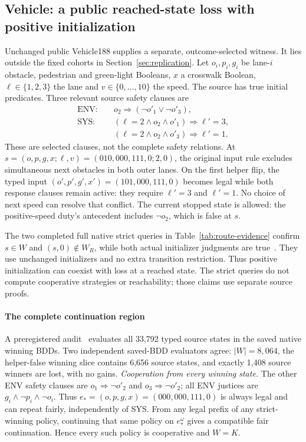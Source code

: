 \subsection{Vehicle: a public reached-state loss with positive initialization}
\label{sec:vehicle}
Unchanged public Vehicle188 supplies a separate, outcome-selected witness.
It lies outside the fixed cohorts in Section~\ref{sec:replication}.
Let $o_i,p_i,g_i$ be lane-$i$ obstacle, pedestrian and green-light
Booleans, $x$ a crosswalk Boolean, $\ell\in\{1,2,3\}$ the lane and
$v\in\{0,\ldots,10\}$ the speed. The source has true initial predicates.
Three relevant source safety clauses are
\[
\begin{aligned}
\mathrm{ENV}:\quad &o_2\Rightarrow(\neg o'_1\lor\neg o'_3),\\
\mathrm{SYS}:\quad &(\ell=2\land o_2\land o'_1)\Rightarrow\ell'=3,\\
& (\ell=2\land o_2\land o'_3)\Rightarrow\ell'=1.
\end{aligned}
\]
These are selected clauses, not the complete safety relations. At
$s=(o,p,g,x;\ell,v)=(010,000,111,0;2,0)$, the original input rule
excludes simultaneous next obstacles in both outer lanes. On the first
helper flip, the typed input $(o',p',g',x')=(101,000,111,0)$ becomes
legal while both response clauses remain active: they require
$\ell'=3$ and $\ell'=1$. No choice of next speed can resolve that conflict.
The current stopped state is allowed: the positive-speed duty's antecedent
includes $\neg o_2$, which is false at $s$.

The two completed full native strict queries in
Table~\ref{tab:route-evidence} confirm $s\in W$ and $(s,0)\notin W_R$,
while both actual initializer judgments are true~\cite{vehicleartifact}.
They use unchanged initializers and no extra transition restriction.
Thus positive initialization can coexist with loss at a reached state.
The strict queries do not compute cooperative strategies or reachability;
those claims use separate source proofs.

\paragraph{The complete continuation region}
A preregistered audit~\cite{vehiclewholeartifact} evaluates all 33,792 typed source states in the
saved native winning BDDs. Two independent saved-BDD evaluators agree:
$|W|=8,064$, the helper-false winning slice contains 6,656 source states,
and exactly 1,408 source winners are lost, with no gains.
\emph{Cooperation from every winning state.}
The other ENV safety clauses are $o_1\Rightarrow\neg o'_2$ and
$o_3\Rightarrow\neg o'_2$; all ENV justices are
$g_i\land\neg p_i\land\neg o_i$. Thus
$e_*=(o,p,g,x)=(000,000,111,0)$ is always legal and can repeat fairly,
independently of SYS. From any legal prefix of any strict-winning policy,
continuing that same policy on $e_*^\omega$ gives a compatible fair
continuation. Hence every such policy is cooperative and $W=K$.

